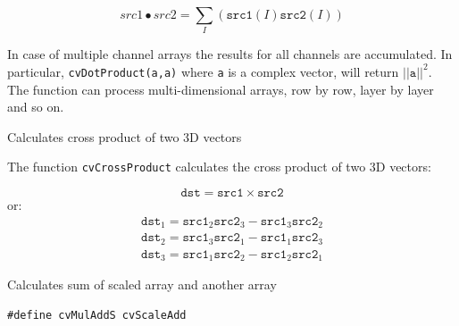 \[
src1 \bullet src2 = \sum_I (\texttt{src1}(I) \texttt{src2}(I))
\]

In case of multiple channel arrays the results for all channels are accumulated. In particular, \texttt{cvDotProduct(a,a)} where \texttt{a} is a complex vector, will return $||\texttt{a}||^2$.
The function can process multi-dimensional arrays, row by row, layer by layer and so on.

\label{CrossProduct}

Calculates cross product of two 3D vectors


\begin{description}
\end{description}


The function \texttt{cvCrossProduct} calculates the cross product of two 3D vectors:

\[ \texttt{dst} = \texttt{src1} \times \texttt{src2} \]
or:
\[
\begin{array}{l}
\texttt{dst}_1 = \texttt{src1}_2 \texttt{src2}_3 - \texttt{src1}_3 \texttt{src2}_2\\
\texttt{dst}_2 = \texttt{src1}_3 \texttt{src2}_1 - \texttt{src1}_1 \texttt{src2}_3\\
\texttt{dst}_3 = \texttt{src1}_1 \texttt{src2}_2 - \texttt{src1}_2 \texttt{src2}_1
\end{array}
\]

\label{ScaleAdd}

Calculates sum of scaled array and another array

\begin{lstlisting}
#define cvMulAddS cvScaleAdd
\end{lstlisting}

\begin{description}
\end{description}

